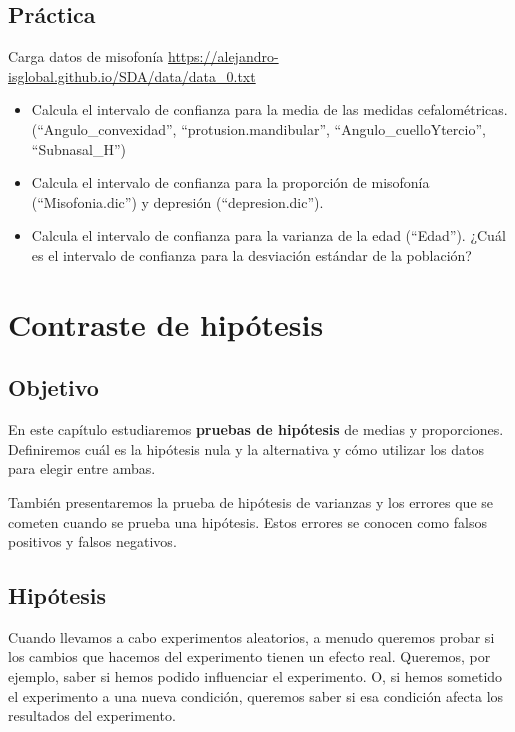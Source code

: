 \documentclass[
]{book}
\begin{document}
\hypertarget{pruxe1ctica}{%
\section{Práctica}\label{pruxe1ctica}}

Carga datos de misofonía \url{https://alejandro-isglobal.github.io/SDA/data/data_0.txt}

\begin{itemize}
\item
  Calcula el intervalo de confianza para la media de las medidas cefalométricas. (``Angulo\_convexidad'', ``protusion.mandibular'', ``Angulo\_cuelloYtercio'', ``Subnasal\_H'')
\item
  Calcula el intervalo de confianza para la proporción de misofonía (``Misofonia.dic'') y depresión (``depresion.dic'').
\item
  Calcula el intervalo de confianza para la varianza de la edad (``Edad''). ¿Cuál es el intervalo de confianza para la desviación estándar de la población?
\end{itemize}

\hypertarget{contraste-de-hipuxf3tesis}{%
\chapter{Contraste de hipótesis}\label{contraste-de-hipuxf3tesis}}

\hypertarget{objetivo-10}{%
\section{Objetivo}\label{objetivo-10}}

En este capítulo estudiaremos \textbf{pruebas de hipótesis} de medias y proporciones. Definiremos cuál es la hipótesis nula y la alternativa y cómo utilizar los datos para elegir entre ambas.

También presentaremos la prueba de hipótesis de varianzas y los errores que se cometen cuando se prueba una hipótesis. Estos errores se conocen como falsos positivos y falsos negativos.

\hypertarget{hipuxf3tesis}{%
\section{Hipótesis}\label{hipuxf3tesis}}

Cuando llevamos a cabo experimentos aleatorios, a menudo queremos probar si los cambios que hacemos del experimento tienen un efecto real. Queremos, por ejemplo, saber si hemos podido influenciar el experimento. O, si hemos sometido el experimento a una nueva condición, queremos saber si esa condición afecta los resultados del experimento.
\end{document}
